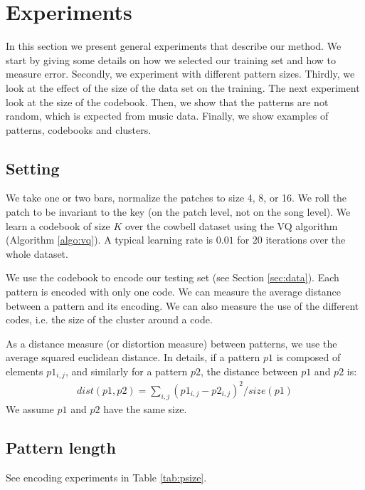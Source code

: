 \documentclass{article}
\begin{document}
\section{Experiments}\label{sec:experiments}
In this section we present general experiments that describe our method.
We start by giving some details on how we selected our training set and
how to measure error. Secondly, we experiment with different pattern sizes.
Thirdly, we look at the effect of the size of the
data set on the training. The next experiment look at the size of the
codebook. Then, we show that the patterns are not random,
which is expected from music data. Finally, we show examples of patterns,
codebooks and clusters.


\subsection{Setting}\label{ssec:setting}
We take one or two bars, normalize the patches to size 4, 8, or 16.
We roll the patch to be invariant to the key (on the patch level, not on
the song level). We learn a codebook of size $K$ over the cowbell dataset 
using the VQ algorithm (Algorithm \ref{algo:vq}). A typical learning rate 
is $0.01$ for $20$ iterations over the whole dataset.

We use the codebook to encode our testing set (see Section \ref{sec:data}).
Each pattern is encoded with only one code. We can measure the average
distance between a pattern and its encoding. We can also measure the use
of the different codes, i.e. the size of the cluster around a code.

As a distance measure (or distortion measure) between patterns, we use
the average squared euclidean distance. In details, if a pattern $p1$
is composed of elements $p1_{i,j}$, and similarly for a pattern $p2$,
the distance between $p1$ and $p2$ is:
\begin{eqnarray}
  dist(p1,p2) = \sum_{i,j} (p1_{i,j} - p2_{i,j})^2 / size(p1)  \label{eq:dist}
\end{eqnarray}
We assume $p1$ and $p2$ have the same size.


\subsection{Pattern length}
See encoding experiments in Table \ref{tab:psize}.
\end{document}
